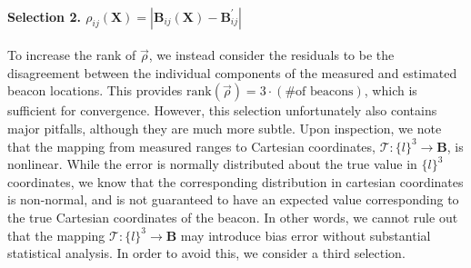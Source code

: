 \documentclass{report}
\begin{document}
					\paragraph{Selection 2. $\rho_{ij}\left(\mathbf{X}\right)=\left|\mathbf{B}_{ij}\left(\mathbf{X}\right)-{\mathbf{B}^\prime_{ij}}\right|$} To increase the rank of $\vec\rho$, we instead consider the residuals to be the disagreement between the individual components of the measured and estimated beacon locations. This provides $\text{rank}\left(\vec\rho\right)=3\cdot(\text{\# of beacons})$, which is sufficient for convergence. However, this selection unfortunately also contains major pitfalls, although they are much more subtle. Upon inspection, we note that the mapping from measured ranges to Cartesian coordinates, $\mathcal{T}:\{l\}^3\to\mathbf{B}$, is nonlinear. While the error is normally distributed about the true value in $\{l\}^3$ coordinates, we know that the corresponding distribution in cartesian coordinates is non-normal, and is not guaranteed to have an expected value corresponding to the true Cartesian coordinates of the beacon. In other words, we cannot rule out that the mapping $\mathcal{T}:\{l\}^3\to\mathbf{B}$ may introduce bias error without substantial statistical analysis. In order to avoid this, we consider a third selection.
				
\newpage
				
\end{document}
